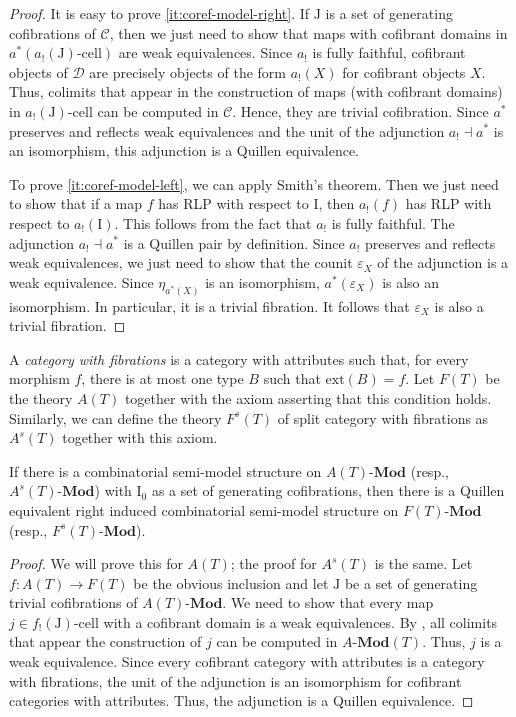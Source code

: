 \documentclass[reqno]{amsart}
\theoremstyle{definition}
\theoremstyle{remark}
\newcommand{\fs}[1]{\mathrm{#1}}
\newcommand{\cat}[1]{\mathcal{#1}}
\newcommand{\C}{\cat{C}}
\newcommand{\D}{\cat{D}}
\newcommand{\bcat}[1]{\mathbf{#1}}
\newcommand{\Mod}[1]{#1\text{-}\bcat{Mod}}
\newcommand{\I}{\fs{I}}
\newcommand{\J}{\fs{J}}
\newcommand{\class}[2]{#1\text{-}\mathrm{#2}}
\newcommand{\Icell}[1][\I]{\class{#1}{cell}}
\numberwithin{figure}{section}
\begin{document}
\begin{proof}
It is easy to prove \eqref{it:coref-model-right}.
If $\J$ is a set of generating cofibrations of $\C$, then we just need to show that maps with cofibrant domains in $a^*(\Icell[a_!(\J)])$ are weak equivalences.
Since $a_!$ is fully faithful, cofibrant objects of $\D$ are precisely objects of the form $a_!(X)$ for cofibrant objects $X$.
Thus, colimits that appear in the construction of maps (with cofibrant domains) in $\Icell[a_!(\J)]$ can be computed in $\C$.
Hence, they are trivial cofibration.
Since $a^*$ preserves and reflects weak equivalences and the unit of the adjunction $a_! \dashv a^*$ is an isomorphism, this adjunction is a Quillen equivalence.

To prove \eqref{it:coref-model-left}, we can apply Smith's theorem.
Then we just need to show that if a map $f$ has RLP with respect to $\I$, then $a_!(f)$ has RLP with respect to $a_!(\I)$.
This follows from the fact that $a_!$ is fully faithful.
The adjunction $a_! \dashv a^*$ is a Quillen pair by definition.
Since $a_!$ preserves and reflects weak equivalences, we just need to show that the counit $\varepsilon_X$ of the adjunction is a weak equivalence.
Since $\eta_{a^*(X)}$ is an isomorphism, $a^*(\varepsilon_X)$ is also an isomorphism.
In particular, it is a trivial fibration.
It follows that $\varepsilon_X$ is also a trivial fibration.
\end{proof}

A \emph{category with fibrations} is a category with attributes such that, for every morphism $f$, there is at most one type $B$ such that $\fs{ext}(B) = f$.
Let $F(T)$ be the theory $A(T)$ together with the axiom asserting that this condition holds.
Similarly, we can define the theory $F^s(T)$ of split category with fibrations as $A^s(T)$ together with this axiom.

\begin{prop}
If there is a combinatorial semi-model structure on $\Mod{A(T)}$ (resp., $\Mod{A^s(T)}$) with $\I_0$ as a set of generating cofibrations,
then there is a Quillen equivalent right induced combinatorial semi-model structure on $\Mod{F(T)}$ (resp., $\Mod{F^s(T)}$).
\end{prop}
\begin{proof}
We will prove this for $A(T)$; the proof for $A^s(T)$ is the same.
Let $f : A(T) \to F(T)$ be the obvious inclusion and let $\J$ be a set of generating trivial cofibrations of $\Mod{A(T)}$.
We need to show that every map $j \in \Icell[f_!(\J)]$ with a cofibrant domain is a weak equivalences.
By , all colimits that appear the construction of $j$ can be computed in $\Mod{A}(T)$.
Thus, $j$ is a weak equivalence.
Since every cofibrant category with attributes is a category with fibrations, the unit of the adjunction is an isomorphism for cofibrant categories with attributes.
Thus, the adjunction is a Quillen equivalence.
\end{proof}
\end{document}
